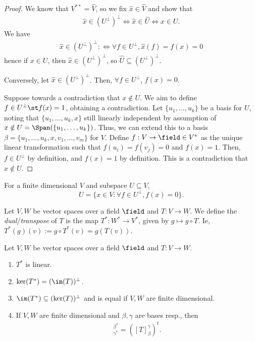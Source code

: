 \begin{proof}
    We know that $V^{\ast \ast} = \hat{V}$, so we fix $\hat{x} \in \hat{V}$ and show that \begin{align*}
        \hat{x} \in (U^\perp)^\perp \iff \hat{x} \in \hat {U} \iff x \in U.
    \end{align*}
We have 
    \begin{align*}
        \hat{x} \in (U^\perp)^\perp :\iff \forall f \in U^\perp, \hat{x}(f) = f(x) = 0
    \end{align*}
    hence if $x \in U$, then $\hat{x} \in (U^\perp)^\perp$, so $\hat{U} \subseteq (U^\perp)^\perp$.

    Conversely, let $\hat{x} \in (U^\perp)^\perp$. Then, $\forall f \in U^\perp$, $f(x) = 0$.
    
    Suppose towards a contradiction that $x \notin U$. We aim to define $f \in U^\perp \st f(x) = 1$, obtaining a contradiction. Let $\{u_1, \dots, u_k\}$ be a basis for $U$, noting that $\{u_1, \dots, u_k, x\}$ still linearly independent by assumption of $x \notin U = \Span(\{u_1, \dots, u_k\})$. Thus, we can extend this to a basis $\beta = \{u_1, \dots, u_k, x, v_1, \dots, v_m\}$ for $V$. Define $f :V \to \field \in V^\ast$ as the unique linear transformation such that $f(u_i) = f(v_j) = 0$ and $f(x) = 1$. Then, $f \in U^\perp$ by definition, and $f(x) = 1$ by definition. This is a contradiction that $x \notin U$.
\end{proof}

\begin{corollary}
    For a finite dimensional $V$ and subspace $U \subseteq V$,
    \[
    U = \{x \in V : \forall f \in U^\perp, f(x) = 0\}.
    \]
\end{corollary}

\begin{definition}
    Let $V, W$ be vector spaces over a field $\field$ and $T : V \to W$. We define the \emph{dual}/\emph{transpose} of $T$ is the map $T^\ast : W^\ast \to V^\ast$, given by $g \mapsto g\circ T$. Ie, $T^\ast(g)(v) := g \circ T^\ast(v) = g(T(v))$.
\end{definition}

\begin{proposition}
    Let $V, W$ be vector spaces over a field $\field$ and $T : V \to W$. \begin{enumerate}
        \item $T^\ast$ is linear.
        \item $\ker(T^\ast) = (\im(T))^\perp$.
        \item $\im(T^\ast) \subseteq (\ker(T))^\perp$ and is equal if $V, W$ are finite dimensional.
        \item If $V,W$ are finite dimensional and $\beta, \gamma$ are bases resp., then \begin{align*}
            [T^\ast]_{\gamma^\ast}^{\beta^\ast} = ([T]_\beta^\gamma)^t.
        \end{align*}
    \end{enumerate}
\end{proposition}

